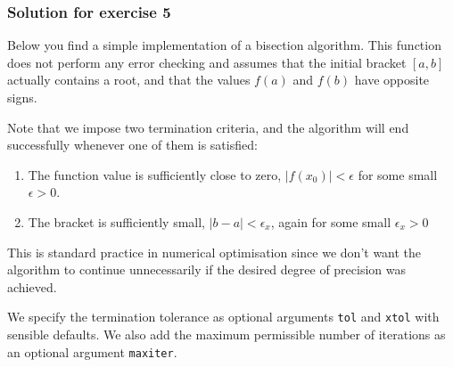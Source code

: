 \documentclass{scrartcl}
\providecommand{\tightlist}{%
      \setlength{\itemsep}{0pt}\setlength{\parskip}{0pt}}
\begin{document}
    \hypertarget{solution-for-exercise-5}{%
\subsubsection{Solution for exercise 5}\label{solution-for-exercise-5}}

    Below you find a simple implementation of a bisection algorithm. This
function does not perform any error checking and assumes that the
initial bracket \([a,b]\) actually contains a root, and that the values
\(f(a)\) and \(f(b)\) have opposite signs.

Note that we impose two termination criteria, and the algorithm will end
successfully whenever one of them is satisfied:

\begin{enumerate}
\def\labelenumi{\arabic{enumi}.}
\tightlist
\item
  The function value is sufficiently close to zero,
  \ie \(|f(x_0)| < \epsilon\) for some small \(\epsilon > 0\).
\item
  The bracket is sufficiently small, \ie \(|b-a| < \epsilon_x\), again
  for some small \(\epsilon_x > 0\)
\end{enumerate}

This is standard practice in numerical optimisation since we don't want
the algorithm to continue unnecessarily if the desired degree of
precision was achieved.

We specify the termination tolerance as optional arguments \texttt{tol}
and \texttt{xtol} with sensible defaults. We also add the maximum
permissible number of iterations as an optional argument
\texttt{maxiter}.
\end{document}
